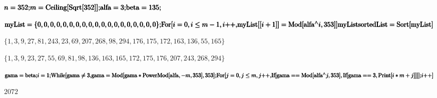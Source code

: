 \documentclass{article}
\begin{document}
\begin{doublespace}
\noindent\(\pmb{n = 352;}\\
\pmb{m = \text{Ceiling}[\text{Sqrt}[352]];}\\
\pmb{\text{alfa} = 3;}\\
\pmb{\text{beta} = 135;}\)
\end{doublespace}

\begin{doublespace}
\noindent\(\pmb{\text{myList} = \{0,0,0,0,0,0,0,0,0,0,0,0,0,0,0,0,0,0,0\};}\\
\pmb{\text{For}[i = 0, i\leq  m-1, i\text{++},}\\
\pmb{\text{myList}[[i+1]]=\text{Mod}[\text{alfa}{}^{\wedge}i,353]}\\
\pmb{]}\\
\pmb{\text{myList}}\\
\pmb{\text{sortedList} = \text{Sort}[\text{myList}]}\)
\end{doublespace}

\begin{doublespace}
\noindent\(\{1,3,9,27,81,243,23,69,207,268,98,294,176,175,172,163,136,55,165\}\)
\end{doublespace}

\begin{doublespace}
\noindent\(\{1,3,9,23,27,55,69,81,98,136,163,165,172,175,176,207,243,268,294\}\)
\end{doublespace}

\begin{doublespace}
\noindent\(\pmb{\text{gama} = \text{beta};}\\
\pmb{i = 1;}\\
\pmb{\text{While}[\text{gama}\neq 3, }\\
\pmb{\text{gama} = \text{Mod}[\text{gama}*\text{PowerMod}[\text{alfa},-m,353],353];}\\
\pmb{\text{For}[j = 0, j\leq  m,j\text{++},}\\
\pmb{\text{If}[\text{gama} == \text{Mod}[\text{alfa}{}^{\wedge}j,353],\text{If}[\text{gama} == 3,\text{Print}[i*m+j]]}\\
\pmb{]}\\
\pmb{];}\\
\pmb{i\text{++}}\\
\pmb{]}\)
\end{doublespace}

\noindent\(2072\)
\end{document}
